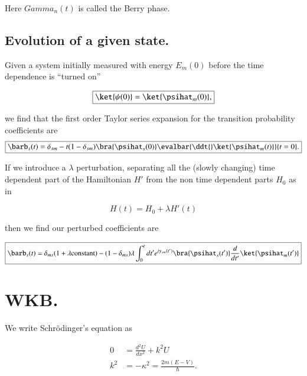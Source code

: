 Here $Gamma_n(t)$ is called the Berry phase.

\subsection{Evolution of a given state.}

Given a system initially measured with energy $E_m(0)$ before the time dependence is ``turned on''

\begin{equation}\label{eqn:qmTwoReview:650}
\boxed{
\ket{\psi(0)} = \ket{\psihat_m(0)},
}
\end{equation}

we find that the first order Taylor series expansion for the transition probability coefficients are
\begin{equation}\label{eqn:qmTwoReview:890}
\boxed{
\barb_s(t) = \delta_{sm} - t (1 - \delta_{sm}) \bra{\psihat_s(0)} \evalbar{\ddt{} \ket{\psihat_m(t)}}{t=0}.
}
\end{equation}

If we introduce a $\lambda$ perturbation, separating all the (slowly changing) time dependent part of the Hamiltonian $H'$ from the non time dependent parts $H_0$ as in

\begin{equation}\label{eqn:qmTwoReview:910}
H(t) = H_0 + \lambda H'(t)
\end{equation}

then we find our perturbed coefficients are

\begin{equation}\label{eqn:qmTwoReview:930}
\boxed{
\barb_s(t) 
=
\delta_{ms}(1 + \lambda \text{constant})
- 
(1-\delta_{ms}) \lambda
\int_0^t dt'
e^{i \gamma_{sm}(t') } \bra{\psihat_s(t')} \frac{d}{dt'} \ket{\psihat_m(t')} 
}
\end{equation}

\section{WKB.}

We write Schr\"{o}dinger's equation as

\begin{equation}\label{eqn:qmTwoReview:670}
\boxed{
\begin{aligned}
0 &= \frac{d^2 U}{dx^2} + k^2 U \\
k^2 &= -\kappa^2 = \frac{2m (E - V)}{\hbar}.
\end{aligned}
}
\end{equation}

